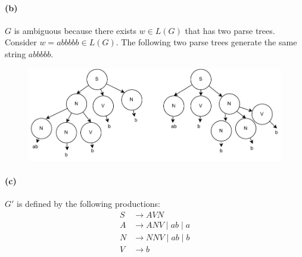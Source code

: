 \documentclass[12pt]{article}
\begin{document}
\paragraph*{(b)} \(G\) is ambiguous because there exists \(w \in L(G)\) that has two parse trees. Consider \(w = abbbbb \in L(G)\). The following two parse trees generate the same string \(abbbbb\).
\begin{figure}[htp!]
  \centering
  \includegraphics[scale = 0.9]{ex5b.pdf}
\end{figure}

\paragraph*{(c)} \(G'\) is defined by the following productions:
\begin{align*}
  S &\to AVN\\
  A &\to ANV \mid ab \mid a\\
  N &\to NNV \mid ab \mid b\\
  V &\to b
\end{align*}
\end{document}
